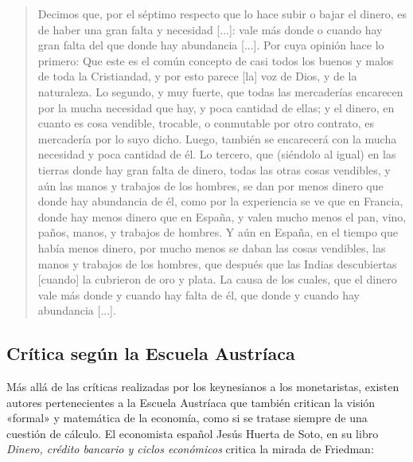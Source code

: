 \documentclass[12pt,a4paper,twoside]{book}
\begin{document}
\begin{quotation}
Decimos que, por el séptimo respecto que lo hace subir o bajar el dinero, es de haber una gran falta y necesidad [...]: vale más donde o cuando hay gran falta del que donde hay abundancia [...]. Por cuya opinión hace lo primero: Que este es el común concepto de casi todos los buenos y malos de toda la Cristiandad, y por esto parece [la] voz de Dios, y de la naturaleza. Lo segundo, y muy fuerte, que todas las mercaderías encarecen por la mucha necesidad que hay, y poca cantidad de ellas; y el dinero, en cuanto es cosa vendible, trocable, o conmutable por otro contrato, es mercadería por lo suyo dicho. Luego, también se encarecerá con la mucha necesidad y poca cantidad de él. Lo tercero, que (siéndolo al igual) en las tierras donde hay gran falta de dinero, todas las otras cosas vendibles, y aún las manos y trabajos de los hombres, se dan por menos dinero que donde hay abundancia de él, como por la experiencia se ve que en Francia, donde hay menos dinero que en España, y valen mucho menos el pan, vino, paños, manos, y trabajos de hombres. Y aún en España, en el tiempo que había menos dinero, por mucho menos se daban las cosas vendibles, las manos y trabajos de los hombres, que después que las Indias descubiertas [cuando] la cubrieron de oro y plata. La causa de los cuales, que el dinero vale más donde y cuando hay falta de él, que donde y cuando hay abundancia [...]. \cite[págs. 54-55]{azpilcueta}
\end{quotation}

\subsection{Crítica según la Escuela Austríaca}
Más allá de las críticas realizadas por los keynesianos a los monetaristas, existen autores pertenecientes a la Escuela Austríaca que también critican la visión «formal» y matemática de la economía, como si se tratase siempre de una cuestión de cálculo. El economista español Jesús Huerta de Soto, en su libro \textit{Dinero, crédito bancario y ciclos económicos} critica la mirada de Friedman:
\end{document}
